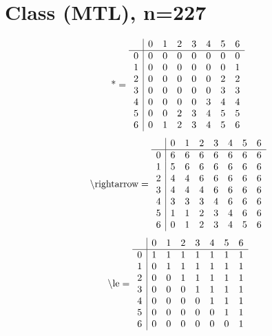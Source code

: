 \documentclass[11pt]{article}
\begin{document}
\section{Class (MTL), n=227}
\[\text{*} = 
\begin{array}{r | r r r r r r r}
 & 0 & 1 & 2 & 3 & 4 & 5 & 6 \\ \hline
0 & 0 & 0 & 0 & 0 & 0 & 0 & 0 \\
1 & 0 & 0 & 0 & 0 & 0 & 0 & 1 \\
2 & 0 & 0 & 0 & 0 & 0 & 2 & 2 \\
3 & 0 & 0 & 0 & 0 & 0 & 3 & 3 \\
4 & 0 & 0 & 0 & 0 & 3 & 4 & 4 \\
5 & 0 & 0 & 2 & 3 & 4 & 5 & 5 \\
6 & 0 & 1 & 2 & 3 & 4 & 5 & 6 \\
\end{array}
\]
\[\text{\textbackslash rightarrow} = 
\begin{array}{r | r r r r r r r}
 & 0 & 1 & 2 & 3 & 4 & 5 & 6 \\ \hline
0 & 6 & 6 & 6 & 6 & 6 & 6 & 6 \\
1 & 5 & 6 & 6 & 6 & 6 & 6 & 6 \\
2 & 4 & 4 & 6 & 6 & 6 & 6 & 6 \\
3 & 4 & 4 & 4 & 6 & 6 & 6 & 6 \\
4 & 3 & 3 & 3 & 4 & 6 & 6 & 6 \\
5 & 1 & 1 & 2 & 3 & 4 & 6 & 6 \\
6 & 0 & 1 & 2 & 3 & 4 & 5 & 6 \\
\end{array}
\]
\[\text{\textbackslash le} = 
\begin{array}{r | r r r r r r r}
 & 0 & 1 & 2 & 3 & 4 & 5 & 6 \\ \hline
0 & 1 & 1 & 1 & 1 & 1 & 1 & 1 \\
1 & 0 & 1 & 1 & 1 & 1 & 1 & 1 \\
2 & 0 & 0 & 1 & 1 & 1 & 1 & 1 \\
3 & 0 & 0 & 0 & 1 & 1 & 1 & 1 \\
4 & 0 & 0 & 0 & 0 & 1 & 1 & 1 \\
5 & 0 & 0 & 0 & 0 & 0 & 1 & 1 \\
6 & 0 & 0 & 0 & 0 & 0 & 0 & 1 \\
\end{array}
\]
\end{document}

